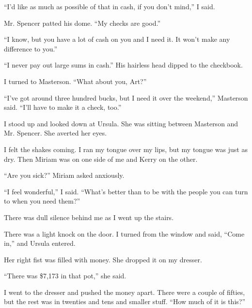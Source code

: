 \documentclass{novel}
\begin{document}
“I’d like as much as possible of that in cash, if you don’t mind,” I said.

Mr. Spencer patted his dome. “My checks are good.”

“I know, but you have a lot of cash on you and I need it. It won’t make any difference to you.”

“I never pay out large sums in cash.” His hairless head dipped to the checkbook.

I turned to Masterson. “What about you, Art?”

“I’ve got around three hundred bucks, but I need it over the weekend,” Masterson said. “I’ll have to make it a check, too.”

I stood up and looked down at Ursula. She was sitting between Masterson and Mr. Spencer. She averted her eyes.

I felt the shakes coming. I ran my tongue over my lips, but my tongue was just as dry. Then Miriam was on one side of me and Kerry on the other. 

“Are you sick?” Miriam asked anxiously.

“I feel wonderful,” I said. “What’s better than to be with the people you can turn to when you need them?”

There was dull silence behind me as I went up the stairs.

\vspace{2\nbs}
\clearpage
\thispagestyle{empty}
\begin{ChapterStart}
\vspace{3\nbs}
\end{ChapterStart}

There was a light knock on the door. I turned from the window and said, “Come in,” and Ursula entered.

Her right fist was filled with money. She dropped it on my dresser.

“There was \$7,173 in that pot,” she said.

I went to the dresser and pushed the money apart. There were a couple of fifties, but the rest was in twenties and tens and smaller stuff. “How much of it is this?”
\end{document}
